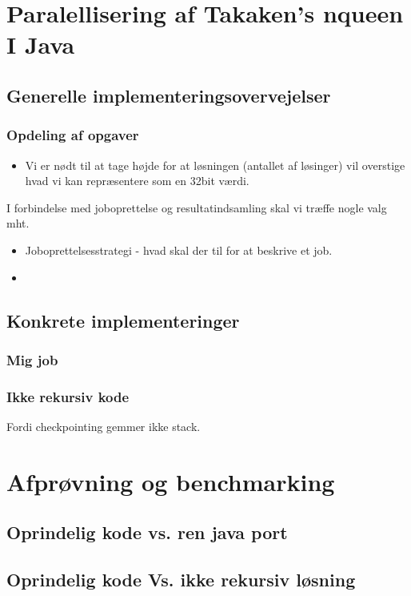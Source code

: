 \documentclass[a4,10pt]{article}
\begin{document}
\section{Paralellisering af Takaken's nqueen I Java}

\subsection{Generelle implementeringsovervejelser}
\subsubsection{Opdeling af opgaver}

\begin{itemize}
\item{Vi er nødt til at tage højde for at løsningen (antallet af løsinger) vil overstige hvad vi kan repræsentere som en 32bit værdi. }
\end{itemize}

I forbindelse med joboprettelse og resultatindsamling skal vi træffe nogle valg mht.  
\begin{itemize}
\item{Joboprettelsesstrategi - hvad skal der til for at beskrive et job.}
\item{}
\end{itemize}

\subsection{Konkrete implementeringer}
\subsubsection{Mig job}\label{label}
\subsubsection{Ikke rekursiv kode}
Fordi checkpointing gemmer ikke stack.
\section{Afprøvning og benchmarking}
\subsection{Oprindelig kode vs. ren java port}
\subsection{Oprindelig kode Vs. ikke rekursiv løsning}
\end{document}

